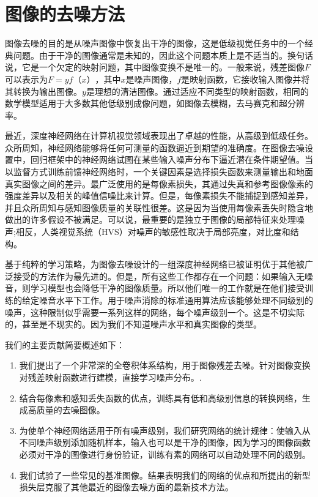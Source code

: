 \chapter{图像的去噪方法}
\label{chap:Denoising}

图像去噪的目的是从噪声图像中恢复出干净的图像，这是低级视觉任务中的一个经典问题。由于干净的图像通常是未知的，因此这个问题本质上是不适当的。换句话说，它是一个欠定的映射问题，其中图像变换不是唯一的。一般来说，残差图像$ F $可以表示为$ F = yf（x）$，其中$ x $是噪声图像，$ f $是映射函数，它接收输入图像并将其转换为输出图像。$ y $是理想的清洁图像。通过适应不同类型的映射函数，相同的数学模型适用于大多数其他低级别成像问题，如图像去模糊，去马赛克和超分辨率。

最近，深度神经网络在计算机视觉领域表现出了卓越的性能，从高级到低级任务。众所周知，神经网络能够将任何可测量的函数逼近到期望的准确度\cite{Hornik1989}。在图像去噪设置中，回归框架中的神经网络试图在某些输入噪声分布下逼近潜在条件期望值。当以监督方式训练前馈神经网络时，一个关键因素是选择损失函数来测量输出和地面真实图像之间的差异。最广泛使用的是每像素损失，其通过失真和参考图像像素的强度差异以及相关的峰值信噪比\cite{Wang2004}来计算。但是，每像素损失不能捕捉到感知差异，并且众所周知与感知图像质量的关联性很差\cite{Zhao2015,Zhanga2012}。这是因为当使用每像素丢失时隐含地做出的许多假设不被满足。可以说，最重要的是独立于图像的局部特征来处理噪声;相反，人类视觉系统（HVS）对噪声的敏感性取决于局部亮度，对比度和结构\citep{Wang2004}。

基于纯粹的学习策略，为图像去噪设计的一组深度神经网络已被证明优于其他被广泛接受的方法作为最先进的\cite{Burger2012}。但是，所有这些工作都存在一个问题：如果输入无噪音，则学习模型也会降低干净的图像质量。所以他们唯一的工作就是在他们接受训练的给定噪音水平下工作。用于噪声消除的标准通用算法应该能够处理不同级别的噪声，这种限制似乎需要一系列这样的网络，每个噪声级别一个。这是不切实际的，甚至是不现实的。因为我们不知道噪声水平和真实图像的类型。

我们的主要贡献简要概述如下：

\begin{enumerate}

\item 我们提出了一个非常深的全卷积体系结构，用于图像残差去噪。针对图像变换对残差映射函数进行建模，直接学习噪声分布。. 

\item 结合每像素和感知丢失函数的优点，训练具有低和高级别信息的转换网络，生成高质量的去噪图像。

\item 为使单个神经网络适用于所有噪声级别，我们研究网络的统计规律：使输入从不同噪声级别添加随机样本，输入也可以是干净的图像，因为学习的图像函数必须对干净的图像进行身份验证，训练有素的网络可以自动处理不同的级别。

\item 我们试验了一些常见的基准图像。结果表明我们的网络的优点和所提出的新型损失层克服了其他最近的图像去噪方面的最新技术方法。

\end{enumerate}

